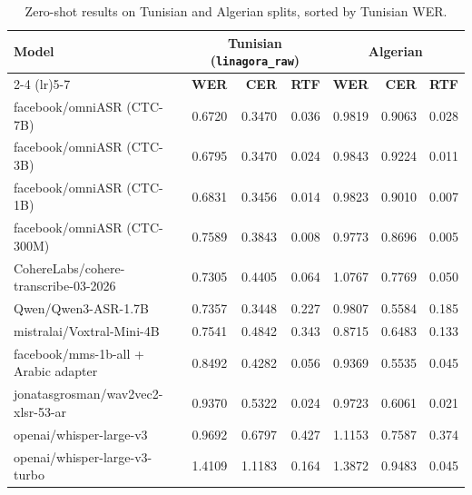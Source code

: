 \documentclass[12pt,a4paper]{report}
\begin{document}
\begin{table}[H]
\centering
\small
\begin{tabular}{lrrrrrr}
\toprule
\multirow{2}{*}{\textbf{Model}} &
\multicolumn{3}{c}{\textbf{Tunisian} (\texttt{linagora\_raw})} &
\multicolumn{3}{c}{\textbf{Algerian}} \\
\cmidrule(lr){2-4} \cmidrule(lr){5-7}
& \textbf{WER} & \textbf{CER} & \textbf{RTF}
& \textbf{WER} & \textbf{CER} & \textbf{RTF} \\
\midrule
facebook/omniASR (CTC-7B)            & 0.6720 & 0.3470 & 0.036 & 0.9819 & 0.9063 & 0.028 \\
facebook/omniASR (CTC-3B)            & 0.6795 & 0.3470 & 0.024 & 0.9843 & 0.9224 & 0.011 \\
facebook/omniASR (CTC-1B)            & 0.6831 & 0.3456 & 0.014 & 0.9823 & 0.9010 & 0.007 \\
facebook/omniASR (CTC-300M)          & 0.7589 & 0.3843 & 0.008 & 0.9773 & 0.8696 & 0.005 \\
CohereLabs/cohere-transcribe-03-2026 & 0.7305 & 0.4405 & 0.064 & 1.0767 & 0.7769 & 0.050 \\
Qwen/Qwen3-ASR-1.7B                  & 0.7357 & 0.3448 & 0.227 & 0.9807 & 0.5584 & 0.185 \\
mistralai/Voxtral-Mini-4B            & 0.7541 & 0.4842 & 0.343 & 0.8715 & 0.6483 & 0.133 \\
facebook/mms-1b-all + Arabic adapter & 0.8492 & 0.4282 & 0.056 & 0.9369 & 0.5535 & 0.045 \\
jonatasgrosman/wav2vec2-xlsr-53-ar   & 0.9370 & 0.5322 & 0.024 & 0.9723 & 0.6061 & 0.021 \\
openai/whisper-large-v3              & 0.9692 & 0.6797 & 0.427 & 1.1153 & 0.7587 & 0.374 \\
openai/whisper-large-v3-turbo        & 1.4109 & 1.1183 & 0.164 & 1.3872 & 0.9483 & 0.045 \\
\bottomrule
\end{tabular}
\caption{Zero-shot results on Tunisian and Algerian splits, sorted by Tunisian WER.}
\label{tab:zero-shot-asr}
\end{table}
\end{document}
